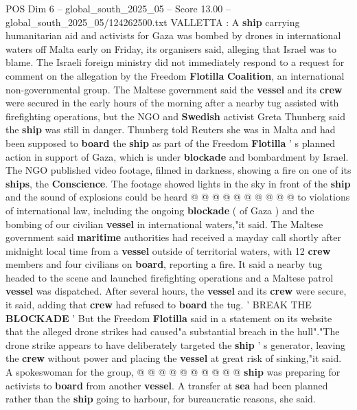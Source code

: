 \begin{textsample}{POS Dim 6 – global\_south\_2025\_05 – Score 13.00 – global\_south\_2025\_05/124262500.txt}  \label{ex:f6_pos_032}
VALLETTA : A \textbf{ship} carrying humanitarian aid and activists for Gaza was bombed by drones in international waters off Malta early on Friday, its organisers said, alleging that Israel was to blame.
The Israeli foreign ministry did not immediately respond to a request for comment on the allegation by the Freedom \textbf{Flotilla} \textbf{Coalition}, an international non-governmental group.
The Maltese government said the \textbf{vessel} and its \textbf{crew} were secured in the early hours of the morning after a nearby tug assisted with firefighting operations, but the NGO and \textbf{Swedish} activist Greta Thunberg said the \textbf{ship} was still in danger.
Thunberg told Reuters she was in Malta and had been supposed to \textbf{board} the \textbf{ship} as part of the Freedom \textbf{Flotilla} ' s planned action in support of Gaza, which is under \textbf{blockade} and bombardment by Israel.
The NGO published video footage, filmed in darkness, showing a fire on one of its \textbf{ships}, the \textbf{Conscience}.
The footage showed lights in the sky in front of the \textbf{ship} and the sound of explosions could be heard @ @ @ @ @ @ @ @ @ @ to violations of international law, including the ongoing \textbf{blockade} ( of Gaza ) and the bombing of our civilian \textbf{vessel} in international waters,"it said.
The Maltese government said \textbf{maritime} authorities had received a mayday call shortly after midnight local time from a \textbf{vessel} outside of territorial waters, with 12 \textbf{crew} members and four civilians on \textbf{board}, reporting a fire.
It said a nearby tug headed to the scene and launched firefighting operations and a Maltese patrol \textbf{vessel} was dispatched.
After several hours, the \textbf{vessel} and its \textbf{crew} were secure, it said, adding that \textbf{crew} had refused to \textbf{board} the tug. ' BREAK THE \textbf{BLOCKADE} ' But the Freedom \textbf{Flotilla} said in a statement on its website that the alleged drone strikes had caused"a substantial breach in the hull"."The drone strike appears to have deliberately targeted the \textbf{ship} ' s generator, leaving the \textbf{crew} without power and placing the \textbf{vessel} at great risk of sinking,"it said.
A spokeswoman for the group, @ @ @ @ @ @ @ @ @ @ \textbf{ship} was preparing for activists to \textbf{board} from another \textbf{vessel}.
A transfer at \textbf{sea} had been planned rather than the \textbf{ship} going to harbour, for bureaucratic reasons, she said.

\end{textsample}
